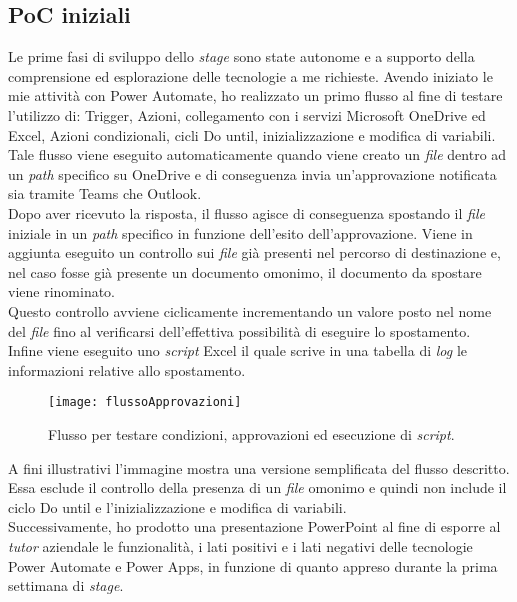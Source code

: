 \subsection{PoC iniziali}
Le prime fasi di sviluppo dello \emph{stage} sono state autonome e a supporto della comprensione ed esplorazione delle tecnologie a me richieste. 
Avendo iniziato le mie attività con Power Automate, ho realizzato un primo flusso al fine di testare l'utilizzo di: Trigger, Azioni, collegamento con i servizi Microsoft OneDrive ed Excel, Azioni condizionali, cicli Do until, inizializzazione e modifica di variabili.\\
Tale flusso viene eseguito automaticamente quando viene creato un \emph{file} dentro ad un \emph{path} specifico su OneDrive e di conseguenza invia un'approvazione notificata sia tramite Teams che Outlook.\\
Dopo aver ricevuto la risposta, il flusso agisce di conseguenza spostando il \emph{file} iniziale in un \emph{path} specifico in funzione dell'esito dell'approvazione. Viene in aggiunta eseguito un controllo sui \emph{file} già presenti nel percorso di destinazione e, nel caso fosse già presente un documento omonimo, il documento da spostare viene rinominato.\\
Questo controllo avviene ciclicamente incrementando un valore posto nel nome del \emph{file} fino al verificarsi dell'effettiva possibilità di eseguire lo spostamento.\\
Infine viene eseguito uno \emph{script} Excel il quale scrive in una tabella di \emph{log} le informazioni relative allo spostamento.
\begin{figure}[htbp] 
    \centering 
    \texttt{[image: flussoApprovazioni]} 
    \caption{Flusso per testare condizioni, approvazioni ed esecuzione di \emph{script}.}
    \label{fig:flussoApprovazioni}
\end{figure}
\newline \noindent A fini illustrativi l'immagine mostra una versione semplificata del flusso descritto. Essa esclude il controllo della presenza di un \emph{file} omonimo e quindi non include il ciclo Do until e l'inizializzazione e modifica di variabili.\\
Successivamente, ho prodotto una presentazione PowerPoint al fine di esporre al \emph{\emph{tutor}} aziendale le funzionalità, i lati positivi e i lati negativi delle tecnologie Power Automate e Power Apps, in funzione di quanto appreso durante la prima settimana di \emph{stage}.

